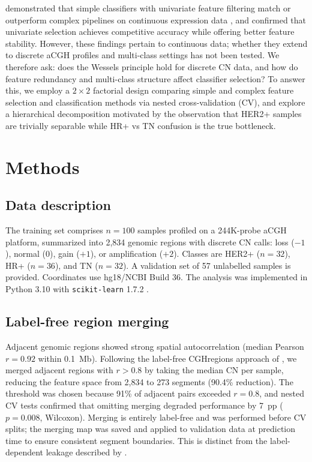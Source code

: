 \documentclass[11pt,a4paper,twocolumn]{article}
\begin{document}
\citet{wessels2005protocol} demonstrated that simple classifiers with univariate feature filtering match or outperform complex pipelines on continuous expression data \citep{vantveer2002gene}, and \citet{haury2011influence} confirmed that univariate selection achieves competitive accuracy while offering better feature stability. However, these findings pertain to continuous data; whether they extend to discrete aCGH profiles and multi-class settings has not been tested. We therefore ask: does the Wessels principle hold for discrete CN data, and how do feature redundancy and multi-class structure affect classifier selection? To answer this, we employ a $2 \times 2$ factorial design comparing simple and complex feature selection and classification methods via nested cross-validation (CV), and explore a hierarchical decomposition motivated by the observation that HER2+ samples are trivially separable while HR+ vs TN confusion is the true bottleneck.

\section{Methods}
\label{sec:methods}

\subsection{Data description}
\label{sec:data}

The training set comprises $n = 100$ samples profiled on a 244K-probe aCGH platform, summarized into 2,834 genomic regions with discrete CN calls: loss ($-1$), normal ($0$), gain ($+1$), or amplification ($+2$). Classes are HER2+ ($n = 32$), HR+ ($n = 36$), and TN ($n = 32$). A validation set of 57 unlabelled samples is provided. Coordinates use hg18/NCBI Build 36. The analysis was implemented in Python 3.10 with \texttt{scikit-learn} 1.7.2 \citep{pedregosa2011sklearn}.

\subsection{Label-free region merging}
\label{sec:merging}

Adjacent genomic regions showed strong spatial autocorrelation (median Pearson $r = 0.92$ within 0.1~Mb). Following the label-free CGHregions approach of \citet{vanwieringen2007cghregions}, we merged adjacent regions with $r > 0.8$ by taking the median CN per sample, reducing the feature space from 2,834 to 273 segments (90.4\% reduction). The threshold was chosen because 91\% of adjacent pairs exceeded $r = 0.8$, and nested CV tests confirmed that omitting merging degraded performance by 7~pp ($p = 0.008$, Wilcoxon). Merging is entirely label-free and was performed before CV splits; the merging map was saved and applied to validation data at prediction time to ensure consistent segment boundaries. This is distinct from the label-dependent leakage described by \citet{ambroise2002selection}.
\end{document}
